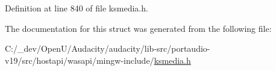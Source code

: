 Definition at line 840 of file ksmedia.\+h.



The documentation for this struct was generated from the following file\+:\begin{DoxyCompactItemize}
\item 
C\+:/\+\_\+dev/\+Open\+U/\+Audacity/audacity/lib-\/src/portaudio-\/v19/src/hostapi/wasapi/mingw-\/include/\hyperlink{ksmedia_8h}{ksmedia.\+h}\end{DoxyCompactItemize}

